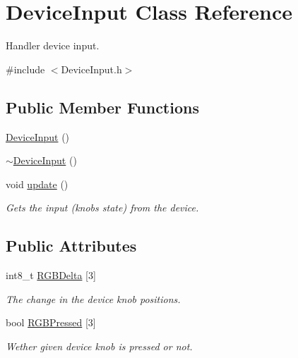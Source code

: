 \hypertarget{classDeviceInput}{}\section{Device\+Input Class Reference}
\label{classDeviceInput}


Handler device input.  




{\ttfamily \#include $<$Device\+Input.\+h$>$}

\subsection*{Public Member Functions}
\begin{DoxyCompactItemize}
\item 
\mbox{\hyperlink{classDeviceInput_a5a5d144c0a4a2d0fedfd85fcb687a716}{Device\+Input}} ()
\item 
\mbox{\hyperlink{classDeviceInput_a6c06d020cca58b3d4763e1717382b1a8}{$\sim$\+Device\+Input}} ()
\item 
\mbox{\label{classDeviceInput_ae6af261f4e6fa656dad4bd4a1efddbc6}} 
void \mbox{\hyperlink{classDeviceInput_ae6af261f4e6fa656dad4bd4a1efddbc6}{update}} ()
\begin{DoxyCompactList}\small\item\em Gets the input (knobs state) from the device. \end{DoxyCompactList}\end{DoxyCompactItemize}
\subsection*{Public Attributes}
\begin{DoxyCompactItemize}
\item 
\mbox{\label{classDeviceInput_a2dae4108527f110262644b6a2609a213}} 
int8\+\_\+t \mbox{\hyperlink{classDeviceInput_a2dae4108527f110262644b6a2609a213}{R\+G\+B\+Delta}} \mbox{[}3\mbox{]}
\begin{DoxyCompactList}\small\item\em The change in the device knob positions. \end{DoxyCompactList}\item 
\mbox{\label{classDeviceInput_a27dd22c6d022b77c645899a8793d511a}} 
bool \mbox{\hyperlink{classDeviceInput_a27dd22c6d022b77c645899a8793d511a}{R\+G\+B\+Pressed}} \mbox{[}3\mbox{]}
\begin{DoxyCompactList}\small\item\em Wether given device knob is pressed or not. \end{DoxyCompactList}\end{DoxyCompactItemize}


